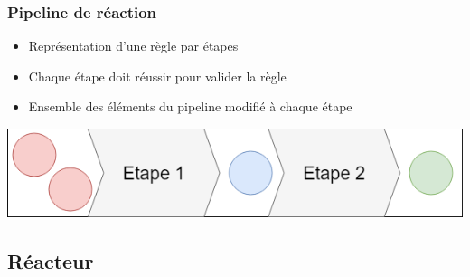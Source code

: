 \documentclass{beamer}
\begin{document}
\begin{frame}
\frametitle{Pipeline de réaction}
\begin{itemize}
    \item Représentation d’une règle par étapes
    \item Chaque étape doit réussir pour valider la règle
    \item Ensemble des éléments du pipeline modifié à chaque étape
\end{itemize}
\begin{center}
\includegraphics[scale=0.3]{img/Pipeline.png}
\end{center}
\end{frame}

\subsection{Réacteur}
\end{document}
